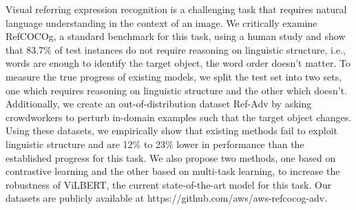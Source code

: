 Visual referring expression recognition is a challenging task that requires natural language understanding in the context of an image. We critically examine RefCOCOg, a standard benchmark for this task, using a human study and show that 83.7\% of test instances do not require reasoning on linguistic structure, i.e., words are enough to identify the target object, the word order doesn't matter. To measure the true progress of existing models, we split the test set into two sets, one which requires reasoning on linguistic structure and the other which doesn't. Additionally, we create an out-of-distribution dataset Ref-Adv by asking crowdworkers to perturb in-domain examples such that the target object changes. Using these datasets, we empirically show that existing methods fail to exploit linguistic structure and are 12\% to 23\% lower in performance than the established progress for this task. We also propose two methods, one based on contrastive learning and the other based on multi-task learning, to increase the robustness of ViLBERT, the current state-of-the-art model for this task. Our datasets are publicly available at https://github.com/aws/aws-refcocog-adv.
